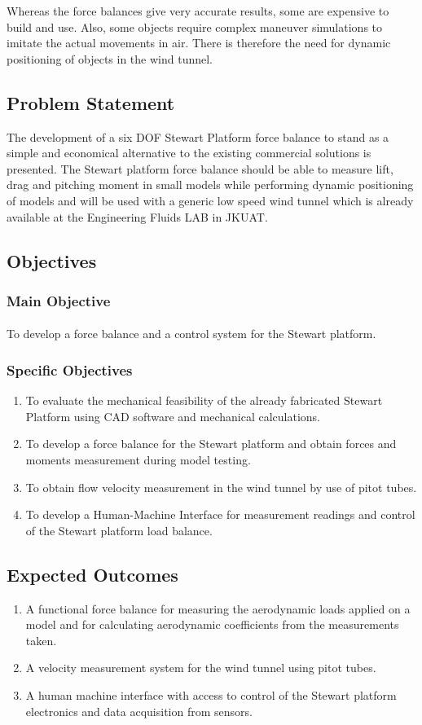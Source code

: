 Whereas the force balances give very accurate results, some are expensive to build and use. Also, some objects require complex maneuver simulations to imitate the actual movements in air. There is therefore the need for dynamic positioning of objects in the wind tunnel.
\subsection{Problem Statement}
 The development of a six DOF Stewart Platform force balance to stand as a simple and economical alternative to the existing commercial solutions is presented. The Stewart platform force balance should be able to measure lift, drag and pitching moment in small models while performing dynamic positioning of models and will be used with a generic low speed wind tunnel which is already available at the Engineering Fluids LAB in JKUAT.
\subsection{Objectives}
\subsubsection{Main Objective}
\paragraph{} To develop a force balance and a control system for the Stewart platform. 
\subsubsection{Specific Objectives}
\begin{enumerate}
\item To evaluate the mechanical feasibility of the already fabricated Stewart Platform using CAD software and mechanical calculations.
\item To develop a force balance for the Stewart platform and obtain forces and moments measurement during model testing.
\item To obtain flow velocity measurement in the wind tunnel by use of pitot tubes.
\item To develop a Human-Machine Interface for measurement readings and control of the Stewart platform load balance.
\end{enumerate}
\subsection{Expected Outcomes}
\begin{enumerate}
\item A functional force balance for measuring the aerodynamic loads applied on a model
and for calculating aerodynamic coefficients from the measurements taken.
\item A velocity measurement system for the wind tunnel using pitot tubes.
\item A human machine interface with access to control of the Stewart platform electronics
and data acquisition from sensors.
\end{enumerate}
